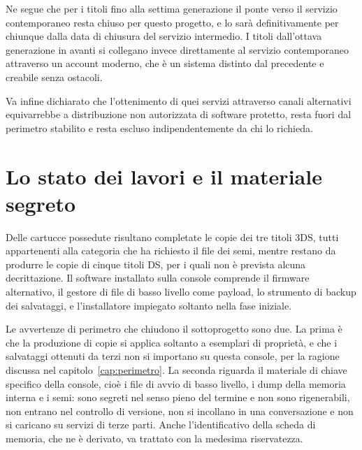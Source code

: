 Ne segue che per i titoli fino alla settima generazione il ponte verso il servizio contemporaneo resta chiuso per questo progetto, e lo sarà definitivamente per chiunque dalla data di chiusura del servizio intermedio. I titoli dall'ottava generazione in avanti si collegano invece direttamente al servizio contemporaneo attraverso un account moderno, che è un sistema distinto dal precedente e creabile senza ostacoli.

Va infine dichiarato che l'ottenimento di quei servizi attraverso canali alternativi equivarrebbe a distribuzione non autorizzata di software protetto, resta fuori dal perimetro stabilito e resta escluso indipendentemente da chi lo richieda.

\section{Lo stato dei lavori e il materiale segreto}

Delle cartucce possedute risultano completate le copie dei tre titoli 3DS, tutti appartenenti alla categoria che ha richiesto il file dei semi, mentre restano da produrre le copie di cinque titoli DS, per i quali non è prevista alcuna decrittazione. Il software installato sulla console comprende il firmware alternativo, il gestore di file di basso livello come payload, lo strumento di backup dei salvataggi, e l'installatore impiegato soltanto nella fase iniziale.

Le avvertenze di perimetro che chiudono il sottoprogetto sono due. La prima è che la produzione di copie si applica soltanto a esemplari di proprietà, e che i salvataggi ottenuti da terzi non si importano su questa console, per la ragione discussa nel capitolo~\ref{cap:perimetro}. La seconda riguarda il materiale di chiave specifico della console, cioè i file di avvio di basso livello, i dump della memoria interna e i semi: sono segreti nel senso pieno del termine e non sono rigenerabili, non entrano nel controllo di versione, non si incollano in una conversazione e non si caricano su servizi di terze parti. Anche l'identificativo della scheda di memoria, che ne è derivato, va trattato con la medesima riservatezza.
